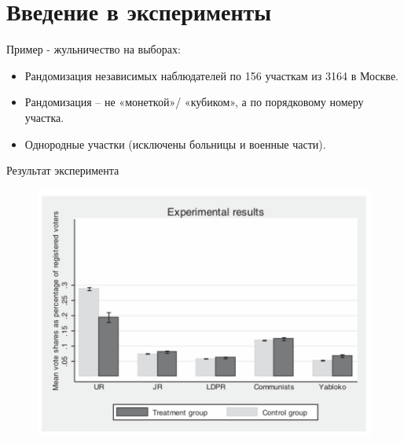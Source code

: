 \section{Введение в эксперименты}

\begin{frame}{Пример - жульничество на выборах: \textcite{enikolopov2013field}}

\begin{itemize}
    \item Рандомизация независимых наблюдателей по 156
участкам из 3164 в Москве.
    \item Рандомизация – не «монеткой»/ «кубиком», а по
порядковому номеру участка.
    \item Однородные участки (исключены больницы и
военные части).
\end{itemize}


\end{frame}

\begin{frame}{Результат эксперимента}

\begin{figure}
    \centering
    \includegraphics[width=\textwidth]{Images/main_result.png}
    \label{fig:my_label}
\end{figure}


\end{frame}


